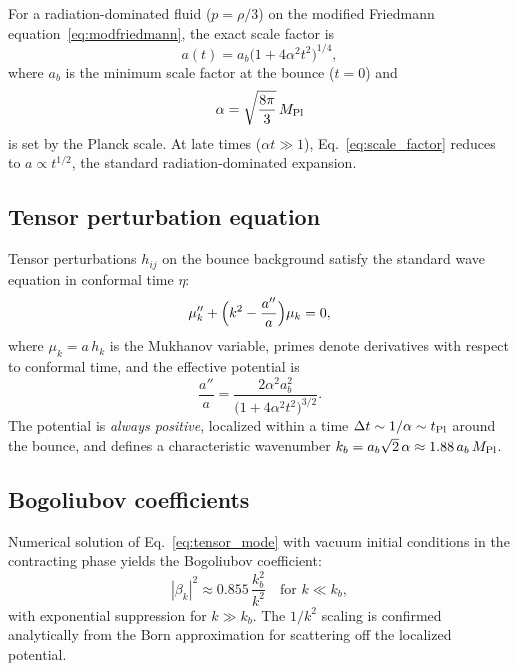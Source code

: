 \documentclass[aps,prd,twocolumn,superscriptaddress,showpacs,preprintnumbers,
  nofootinbib,longbibliography,floatfix]{revtex4-2}
\newcommand{\MPl}{M_{\rm Pl}}
\begin{document}
For a radiation-dominated fluid ($p = \rho/3$) on the modified Friedmann
equation~\eqref{eq:modfriedmann}, the exact scale factor is
\begin{equation}\label{eq:scale_factor}
  a(t) = a_b\bigl(1 + 4\alpha^2 t^2\bigr)^{1/4},
\end{equation}
where $a_b$ is the minimum scale factor at the bounce ($t=0$) and
\begin{equation}\label{eq:alpha}
  \alpha = \sqrt{\frac{8\pi}{3}}\,\MPl
\end{equation}
is set by the Planck scale. At late times ($\alpha t \gg 1$),
Eq.~\eqref{eq:scale_factor} reduces to $a \propto t^{1/2}$, the standard
radiation-dominated expansion.

\subsection{Tensor perturbation equation}

Tensor perturbations $h_{ij}$ on the bounce background satisfy the
standard wave equation in conformal time $\eta$:
\begin{equation}\label{eq:tensor_mode}
  \mu_k'' + \Bigl(k^2 - \frac{a''}{a}\Bigr)\mu_k = 0,
\end{equation}
where $\mu_k = a\,h_k$ is the Mukhanov variable, primes denote
derivatives with respect to conformal time, and the effective potential is
\begin{equation}\label{eq:tensor_potential}
  \frac{a''}{a} = \frac{2\alpha^2 a_b^2}{\bigl(1 + 4\alpha^2 t^2\bigr)^{3/2}}.
\end{equation}
The potential is \textit{always positive}, localized within a time
$\Delta t \sim 1/\alpha \sim t_{\rm Pl}$ around the bounce, and defines a
characteristic wavenumber $k_b = a_b\sqrt{2}\,\alpha \approx
1.88\,a_b\,\MPl$.

\subsection{Bogoliubov coefficients}

Numerical solution of Eq.~\eqref{eq:tensor_mode} with vacuum initial
conditions in the contracting phase yields the Bogoliubov coefficient:
\begin{equation}\label{eq:bogoliubov}
  |\beta_k|^2 \approx 0.855\,\frac{k_b^2}{k^2}
  \quad \text{for } k \ll k_b,
\end{equation}
with exponential suppression for $k \gg k_b$. The $1/k^2$ scaling is
confirmed analytically from the Born approximation for scattering off
the localized potential.
\end{document}
